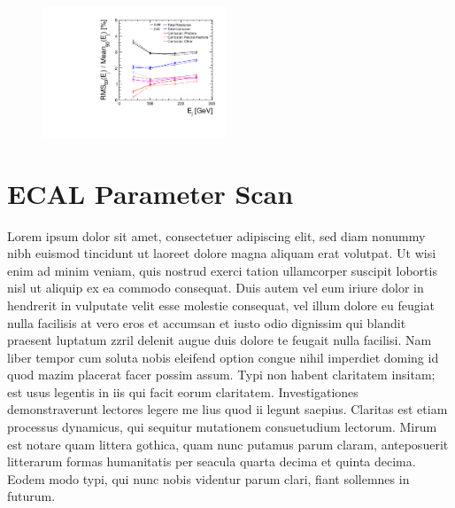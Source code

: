 \documentclass[final,3p,times,twocolumn]{elsarticle}
\begin{document}
\begin{figure}[!h]
  \begin{center}
     \includegraphics[width=0.49\textwidth]{Confusion_vs_E.pdf}
     \caption{\label{}}
  \end{center}
\end{figure}

\section{ECAL Parameter Scan}
Lorem ipsum dolor sit amet, consectetuer adipiscing elit, sed diam nonummy nibh euismod tincidunt ut laoreet dolore magna aliquam erat volutpat. Ut wisi enim ad minim veniam, quis
nostrud exerci tation ullamcorper suscipit lobortis nisl ut aliquip ex ea commodo consequat. Duis autem vel eum iriure dolor in hendrerit in vulputate velit esse molestie consequat,
vel illum dolore eu feugiat nulla facilisis at vero eros et accumsan et iusto odio dignissim qui blandit praesent luptatum zzril delenit augue duis dolore te feugait nulla facilisi.
Nam liber tempor cum soluta nobis eleifend option congue nihil imperdiet doming id quod mazim placerat facer possim assum. Typi non habent claritatem insitam; est usus legentis in
iis qui facit eorum claritatem. Investigationes demonstraverunt lectores legere me lius quod ii legunt saepius. Claritas est etiam processus dynamicus, qui sequitur mutationem
consuetudium lectorum. Mirum est notare quam littera gothica, quam nunc putamus parum claram, anteposuerit litterarum formas humanitatis per seacula quarta decima et quinta
decima. Eodem modo typi, qui nunc nobis videntur parum clari, fiant sollemnes in futurum.
\end{document}
